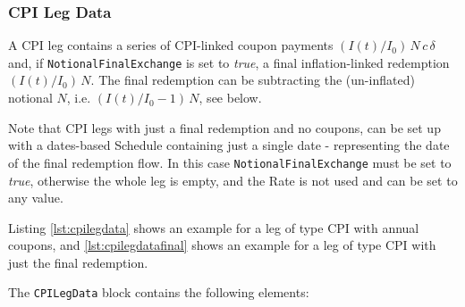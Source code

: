 \subsubsection{CPI Leg Data}
\label{ss:cpilegdata}

A CPI leg contains a series of CPI-linked coupon payments $(I(t)/I_0)\,N\,c\,\delta$ and, if \lstinline!NotionalFinalExchange! is set to \emph{true}, a final
inflation-linked redemption $(I(t)/I_0)\,N$. The final redemption can be
subtracting the (un-inflated) notional $N$, i.e. $(I(t)/I_0-1)\,N$,
see below.

Note that CPI legs with just a final redemption and no coupons, can be set up with a dates-based Schedule containing just a single date - representing the date of the final redemption flow. In this case \lstinline!NotionalFinalExchange! must be set to \emph{true}, otherwise the whole leg is empty, and the Rate is not used and can be set to any value. 

Listing \ref{lst:cpilegdata} shows an example for a leg of type CPI with annual coupons, and \ref{lst:cpilegdatafinal} shows an example for a leg of type CPI with just the final redemption. 

The  \lstinline!CPILegData! block contains the following elements:

